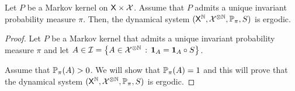 \documentclass[english,graybox,envcountchap,envcountsame,sectrefs,shortlabels]{svmono}
\theoremstyle{style}
\begin{document}


\begin{theorem}\label{ergodic}
Let $P$ be a Markov kernel on $\mathsf{X}\times\mathcal{X}$. Assume that
$P$ admits a unique invariant probability measure $\pi$. Then, the
dynamical system $(\mathsf{X}^{\mathbb{N}},\mathcal{X}^{\otimes\mathbb{N}},\mathbb{P}_{\pi},S)$
is ergodic.
\end{theorem}

\begin{proof}
Let $P$ be a Markov kernel that admits a unique invariant probability
measure $\pi$ and let $A\in\mathcal{I}=\left\{ A\in\mathcal{X}^{\otimes\mathbb{N}}\,:\,\mathbf{1}_{A}=\mathbf{1}_{A}\circ S\right\}$.

Assume that $\mathbb{P}_{\pi}(A)>0$. We will show that $\mathbb{P}_{\pi}(A)=1$
and this will prove that the dynamical system $(\mathsf{X}^{\mathbb{N}},\mathcal{X}^{\otimes\mathbb{N}},\mathbb{P}_{\pi},S)$
is ergodic.


\end{proof}
\end{document}
